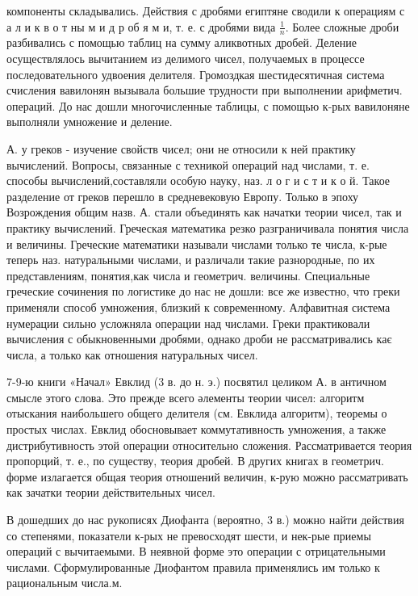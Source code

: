 \documentclass[10pt]{article}
\begin{document}
компоненты складывались. Действия с дробями египтяне сводили к операциям с а л и к в о т ны м и д р об я м и, т. е. с дробями вида $\frac{1}{n}$. Более сложные дроби разбивались с помощью таблиц на сумму аликвотных дробей. Деление осуществлялось вычитанием из делимого чисел, получаемых в процессе последовательного удвоения делителя. Громоздкая шестидесятичная система счисления вавилонян вызывала большие трудности при выполнении арифметич. операций. До нас дошли многочисленные таблицы, с помощью к-рых вавилоняне выполняли умножение и деление.



А. у греков - изучение свойств чисел; они не относили к ней практику вычислений. Вопросы, связанные с техникой операций над числами, т. е. способы вычислений,составляли особую науку, наз. л о г и с т и к о й. Такое разделение от греков перешло в средневековую Европу. Только в эпоху Возрождения общим назв. А. стали объединять как начатки теории чисел, так и практику вычислений. Греческая математика резко разграничивала понятия числа и величины. Греческие математики называли числами только те числа, к-рые теперь наз. натуральными числами, и различали такие разнородные, по их представлениям, понятия,как числа и геометрич. величины. Специальные греческие сочинения по логистике до нас не дошли: все же известно, что греки применяли способ умножения, близкий к современному. Алфавитная система нумерации сильно усложняла операции над числами. Греки практиковали вычисления с обыкновенными дробями, однако дроби не рассматривались кає числа, а только как отношения натуральных чисел.



7-9-ю книги «Начал» Евклид (3 в. до н. э.) посвятил целиком А. в античном смысле этого слова. Это прежде всего әлементы теории чисел: алгоритм отыскания наибольшего общего делителя (см. Евклида алгоритм), теоремы о простых числах. Евклид обосновывает коммутативность умножения, а также дистрибутивность этой операции относительно сложения. Рассматривается теория пропорций, т. е., по существу, теория дробей. В других книгах в геометрич. форме излагается общая теория отношений величин, к-рую можно рассматривать как зачатки теории действительных чисел.



В дошедших до нас рукописях Диофанта (вероятно, 3 в.) можно найти действия со степенями, показатели к-рых не превосходят шести, и нек-рые приемы операций с вычитаемыми. В неявной форме это операции с отрицательными числами. Сформулированные Диофантом правила применялись им только к рациональным числа.м.
\end{document}

